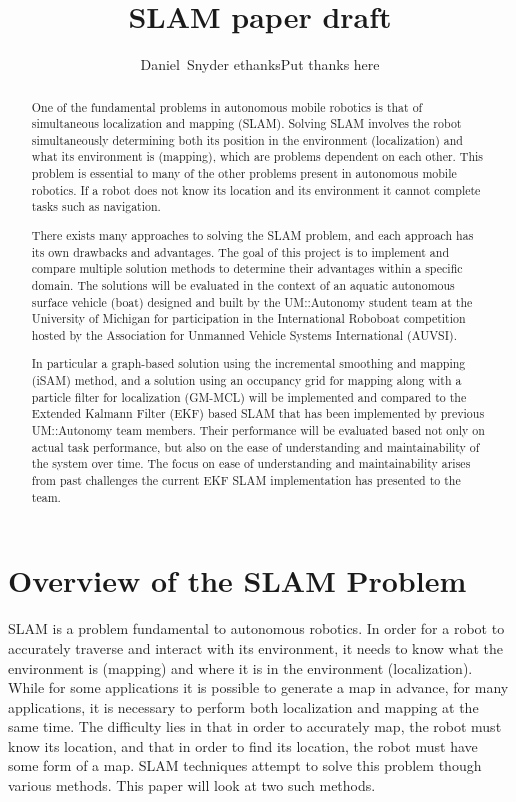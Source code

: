 \documentclass[10pt]{IEEEtran}
\begin{document}
\title{SLAM paper draft}
\author{Daniel~Snyder
ethanks{Put thanks here}
}
\maketitle
\begin{abstract}
One of the fundamental problems in autonomous mobile robotics is that of simultaneous
localization and mapping (SLAM).  Solving SLAM involves the robot simultaneously
determining both its position in the environment (localization) and what its environment
is (mapping), which are problems dependent on each other.  This problem is essential to
many of the other problems present in autonomous mobile robotics.  If a robot does not
know its location and its environment it cannot complete tasks such as navigation.  
 
There exists many approaches to solving the SLAM problem, and each approach has
its own drawbacks and advantages.  The goal of this project is to implement and
compare multiple solution methods to determine their advantages within a specific
domain.  The solutions will be evaluated in the context of an aquatic autonomous surface
vehicle (boat) designed and built by the UM::Autonomy student team at the University
of Michigan for participation in the International Roboboat competition hosted by
the Association for Unmanned Vehicle Systems International (AUVSI).   
  
In particular a graph-based solution using the incremental smoothing and mapping
(iSAM) method, and a solution using an occupancy grid for mapping along with a 
particle filter for localization (GM-MCL) will be implemented and compared
to the Extended Kalmann Filter (EKF) based SLAM that has been implemented by previous
UM::Autonomy team members.  Their performance will be evaluated based not only on
actual task performance, but also on the ease of understanding and maintainability
of the system over time.  The focus on ease of understanding and maintainability
arises from past challenges the current EKF SLAM implementation has presented to the team. 
\end{abstract}

\section{Overview of the SLAM Problem}
SLAM is a problem fundamental to autonomous robotics.  In order for a robot to accurately
traverse and interact with its environment, it needs to know what the environment is 
(mapping) and where it is in the environment (localization).  While for some applications it
is possible to generate a map in advance, for many applications, it is necessary to perform 
both localization and mapping at the same time.  The difficulty lies in that in order to 
accurately map, the robot must know its location, and that in order to find its location, the
robot must have some form of a map.  SLAM techniques attempt to solve this problem though 
various methods.  This paper will look at two such methods.
\end{document}
